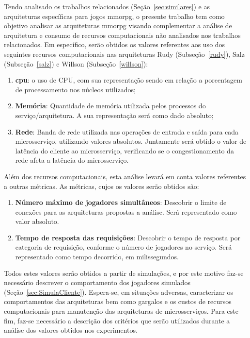 Tendo analisado os trabalhos relacionados (Seção~\ref{sec:similares}) e as arquiteturas específicas para jogos \ac{mmorpg}, o presente trabalho tem como objetivo analisar as arquiteturas \ac{mmorpg} visando complementar a análise de arquitetura e consumo de recursos computacionais não analisados nos trabalhos relacionados.
%
Em específico, serão obtidos os valores referentes aos uso dos seguintes recursos computacionais nas arquiteturas Rudy (Subseção~\ref{rudy}), Salz (Subseção~\ref{salz}) e Willson (Subseção~\ref{willson}):

\begin{enumerate}
  \item \textbf{\ac{cpu}}: o uso de CPU, com sua representação sendo em relação a porcentagem de processamento nos núcleos utilizados;
  \item \textbf{Memória}: Quantidade de memória utilizada pelos processos do serviço/arquitetura. A sua representação será como dado absoluto;
  \item \textbf{Rede}: Banda de rede utilizada nas operações de entrada e saída para cada microsserviço, utilizando valores absolutos. Juntamente será obtido o valor de latência do cliente ao microsserviço, verificando se o congestionamento da rede afeta a latência do microsserviço.
\end{enumerate}

Além dos recursos computacionais, esta análise levará em conta valores referentes a outras métricas.
%
As métricas, cujos os valores serão obtidos são:

\begin{enumerate}
  \item \textbf{Número máximo de jogadores simultâneos}: Descobrir o limite de conexões para as arquiteturas propostas a análise. Será representado como valor absoluto.
  \item \textbf{Tempo de resposta das requisições}: Descobrir o tempo de resposta por categoria de requisição, conforme o número de jogadores no serviço. Será representado como tempo decorrido, em milissegundos.
\end{enumerate}

Todos estes valores serão obtidos a partir de simulações, e por este motivo faz-se necessário descrever o comportamento dos jogadores simulados (Seção~\ref{sec:SimulaCliente}).
%
Espera-se, em situações adversas, caracterizar os comportamentos das arquiteturas bem como gargalos e os custos de recursos computacionais para manutenção das arquiteturas de microsserviços.
%
Para este fim, faz-se necessário a descrição dos critérios que serão utilizados durante a análise dos valores obtidos nos experimentos.

